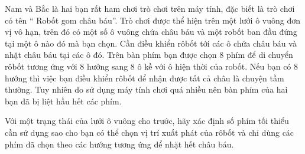 Nam và  Bắc là hai bạn rất ham chơi trò chơi trên máy tính, đặc biết là trò chơi có tên “ Robốt gom châu báu”. Trò chơi được thể hiện trên một lưới ô vuông đơn vị vô hạn, trên đó có một số ô vuông chứa châu báu và một robốt ban đầu đứng tại một ô nào đó mà bạn chọn. Cần điều khiển rôbốt tới các ô chứa châu báu và nhặt châu báu tại các ô đó. Trên bàn phím bạn được chọn 8 phím để di chuyển rôbốt tương ứng với 8 hướng sang 8 ô kề với ô hiện thời của robốt. Nếu bạn có 8 hướng thì việc bạn điều khiển rôbốt để nhận được tất cả châu là chuyện tầm thường. Tuy nhiên do sử dụng máy tính chơi quá nhiều nên bàn phím của hai bạn đã bị liệt hầu hết các phím.  

Với một trạng thái của lưới ô vuông cho trước, hãy xác định số phím tối thiểu cần sử dụng sao cho bạn có thể chọn vị trí xuất phát của rôbốt và chỉ dùng các phím đã chọn theo các hướng tương ứng để nhặt hết châu báu.